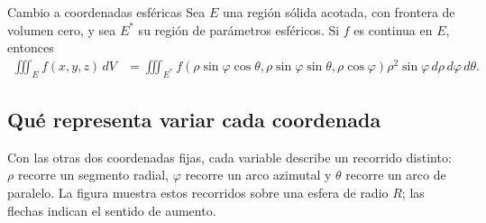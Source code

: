 \begin{mytheorem}{Cambio a coordenadas esféricas}
Sea $E$ una región sólida acotada, con frontera de volumen cero, y sea $E^*$ su región de parámetros esféricos. Si $f$ es continua en $E$, entonces
\begin{align*}
\iiint_E f(x,y,z)\,dV
&=\iiint_{E^*}f(\rho\sin\varphi\cos\theta,
\rho\sin\varphi\sin\theta,\rho\cos\varphi)\rho^2\sin\varphi\,d\rho\,d\varphi\,d\theta.
\end{align*}
\end{mytheorem}

\subsection{Qué representa variar cada coordenada}

Con las otras dos coordenadas fijas, cada variable describe un recorrido distinto: $\rho$ recorre un segmento radial, $\varphi$ recorre un arco azimutal y $\theta$ recorre un arco de paralelo. La figura muestra estos recorridos sobre una esfera de radio $R$; las flechas indican el sentido de aumento.

